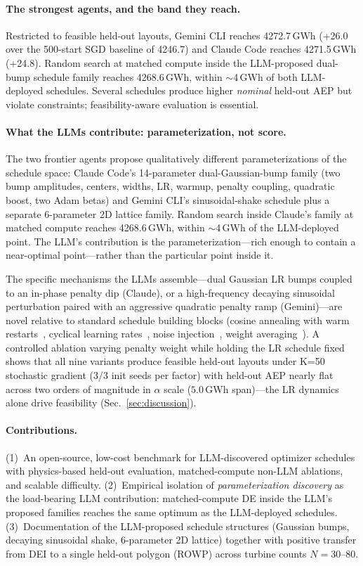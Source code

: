 \paragraph{The strongest agents, and the band they reach.}
Restricted to feasible held-out layouts, Gemini CLI reaches
4272.7\,GWh (+26.0 over the 500-start SGD baseline of 4246.7) and
Claude Code reaches 4271.5\,GWh (+24.8). Random search at matched
compute inside the LLM-proposed dual-bump schedule family reaches
4268.6\,GWh, within $\sim$4\,GWh of both LLM-deployed schedules.
Several schedules produce higher \emph{nominal} held-out AEP but
violate constraints; feasibility-aware evaluation is essential.

\paragraph{What the LLMs contribute: parameterization, not score.}
The two frontier agents propose qualitatively different
parameterizations of the schedule space: Claude Code's
14-parameter dual-Gaussian-bump family (two bump amplitudes,
centers, widths, LR, warmup, penalty coupling, quadratic boost,
two Adam betas) and Gemini CLI's sinusoidal-shake schedule plus a
separate 6-parameter 2D lattice family. Random search inside
Claude's family at matched compute reaches 4268.6\,GWh, within
$\sim$4\,GWh of the LLM-deployed point. The LLM's contribution is
the parameterization---rich enough to contain a near-optimal
point---rather than the particular point inside it.

The specific mechanisms the LLMs assemble---dual Gaussian LR bumps
coupled to an in-phase penalty dip (Claude), or a high-frequency
decaying sinusoidal perturbation paired with an aggressive
quadratic penalty ramp (Gemini)---are novel relative to standard
schedule building blocks (cosine annealing with warm
restarts~\cite{loshchilov2017sgdr}, cyclical learning
rates~\cite{smith2017cyclical,smith2019superconvergence}, noise
injection~\cite{jastrzebski2018factors}, weight
averaging~\cite{izmailov2018swa}). A controlled ablation varying
penalty weight while holding the LR schedule fixed shows that all
nine variants produce feasible held-out layouts under K=50
stochastic gradient (3/3 init seeds per factor) with held-out
AEP nearly flat across two orders of magnitude in $\alpha$ scale
($5.0$\,GWh span)---the LR dynamics alone drive feasibility
(Sec.~\ref{sec:discussion}).

\paragraph{Contributions.}
(1)~An open-source, low-cost benchmark for LLM-discovered optimizer
schedules with physics-based held-out evaluation, matched-compute
non-LLM ablations, and scalable difficulty.
(2)~Empirical isolation of \emph{parameterization discovery} as the
load-bearing LLM contribution: matched-compute DE inside the LLM's
proposed families reaches the same optimum as the LLM-deployed
schedules.
(3)~Documentation of the LLM-proposed schedule structures (Gaussian
bumps, decaying sinusoidal shake, 6-parameter 2D lattice) together
with positive transfer from DEI to a single held-out polygon (ROWP)
across turbine counts $N=30$--$80$.

